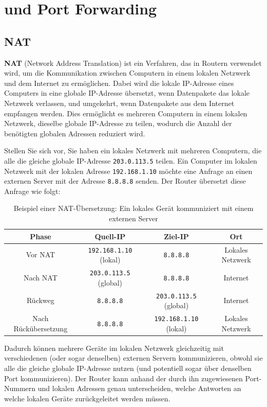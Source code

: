 
\chapter{\texorpdfstring{ und Port Forwarding}{NAT und Port Forwarding}}
\label{app:nat_port_forwarding}
\section{\texorpdfstring{\acrfull{NAT}}{Network Address Translation (NAT)}}
\textbf{\gls{NAT}} (Network Address Translation) ist ein Verfahren, das in Routern verwendet wird, um die Kommunikation zwischen Computern in einem lokalen Netzwerk und dem Internet zu ermöglichen. Dabei wird die lokale \gls{IP}-Adresse eines Computers in eine globale \gls{IP}-Adresse übersetzt, wenn Datenpakete das lokale Netzwerk verlassen, und umgekehrt, wenn Datenpakete aus dem Internet empfangen werden. Dies ermöglicht es mehreren Computern in einem lokalen Netzwerk, dieselbe globale \gls{IP}-Adresse zu teilen, wodurch die Anzahl der benötigten globalen Adressen reduziert wird.

\begin{myexample}
Stellen Sie sich vor, Sie haben ein lokales Netzwerk mit mehreren Computern, die alle die gleiche globale \gls{IP}-Adresse \texttt{203.0.113.5} teilen. Ein Computer im lokalen Netzwerk mit der lokalen Adresse \texttt{192.168.1.10} möchte eine Anfrage an einen externen Server mit der Adresse \texttt{8.8.8.8} senden. Der Router übersetzt diese Anfrage wie folgt:

\begin{table}[H]
	\centering
	\begin{tabular}{cccc}
		\textbf{Phase} & \textbf{Quell-\acrshort{IP}} & \textbf{Ziel-\acrshort{IP}} & \textbf{Ort} \\
		\midrule
		Vor \gls{NAT} & \texttt{192.168.1.10} (lokal) & \texttt{8.8.8.8} & Lokales Netzwerk \\
		\midrule
		Nach \gls{NAT} & \texttt{203.0.113.5} (global) & \texttt{8.8.8.8} & Internet \\
		\midrule
		Rückweg & \texttt{8.8.8.8} & \texttt{203.0.113.5} (global) & Internet \\
		\midrule
		Nach Rückübersetzung & \texttt{8.8.8.8} & \texttt{192.168.1.10} (lokal) & Lokales Netzwerk \\
	\end{tabular}
	\caption{Beispiel einer \gls{NAT}-Übersetzung: Ein lokales Gerät kommuniziert mit einem externen Server}
\end{table}

Dadurch können mehrere Geräte im lokalen Netzwerk gleichzeitig mit verschiedenen (oder sogar denselben) externen Servern kommunizieren, obwohl sie alle die gleiche globale \gls{IP}-Adresse nutzen (und potentiell sogar über denselben Port kommunizieren). Der Router kann anhand der durch ihn zugewiesenen Port-Nummern und lokalen Adressen genau unterscheiden, welche Antworten an welche lokalen Geräte zurückgeleitet werden müssen.
\end{myexample}


